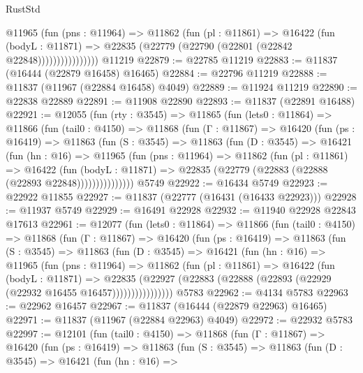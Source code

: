\begin{lexlean}{RustStd}
\begin{coremodule}
{\begin{coremodule}
{{{{{{{{{{{{{{{{{{{{{{{{{{{{{{{{{{{{{{{{{{{{{{{{{{                    @11965
                      (fun (pns : @11964) =>
                      @11862
                        (fun (pl : @11861) =>
                        @16422
                          (fun (bodyL : @11871) =>
                          @22835 (@22779 (@22790 (@22801 (@22842 @22848))))))))))))))))
    @11219
@22879 := @22785 @11219
@22883 := @11837 (@16444 (@22879 @16458) @16465)
@22884 := @22796 @11219
@22888 := @11837 (@11967 (@22884 @16458) @4049)
@22889 := @11924 @11219
@22890 := @22838 @22889
@22891 := @11908 @22890
@22893 := @11837 (@22891 @16488)
@22921 := @12055
    (fun (rty : @3545) =>
    @11865
      (fun (lets0 : @11864) =>
      @11866
        (fun (tail0 : @4150) =>
        @11868
          (fun (Γ : @11867) =>
          @16420
            (fun (ps : @16419) =>
            @11863
              (fun (S : @3545) =>
              @11863
                (fun (D : @3545) =>
                @16421
                  (fun (hn : @16) =>
                  @11965
                    (fun (pns : @11964) =>
                    @11862
                      (fun (pl : @11861) =>
                      @16422
                        (fun (bodyL : @11871) =>
                        @22835 (@22779 (@22883 (@22888 (@22893 @22848)))))))))))))))
    @5749
@22922 := @16434 @5749
@22923 := @22922 @11855
@22927 := @11837 (@22777 (@16431 (@16433 @22923)))
@22928 := @11937 @5749
@22929 := @16491 @22928
@22932 := @11940 @22928 @22843 @17613
@22961 := @12077
    (fun (lets0 : @11864) =>
    @11866
      (fun (tail0 : @4150) =>
      @11868
        (fun (Γ : @11867) =>
        @16420
          (fun (ps : @16419) =>
          @11863
            (fun (S : @3545) =>
            @11863
              (fun (D : @3545) =>
              @16421
                (fun (hn : @16) =>
                @11965
                  (fun (pns : @11964) =>
                  @11862
                    (fun (pl : @11861) =>
                    @16422
                      (fun (bodyL : @11871) =>
                      @22835
                        (@22927
                          (@22883 (@22888 (@22893 (@22929 (@22932 @16455 @16457))))))))))))))))
    @5783
@22962 := @4134 @5783
@22963 := @22962 @16457
@22967 := @11837 (@16444 (@22879 @22963) @16465)
@22971 := @11837 (@11967 (@22884 @22963) @4049)
@22972 := @22932 @5783
@22997 := @12101
    (fun (tail0 : @4150) =>
    @11868
      (fun (Γ : @11867) =>
      @16420
        (fun (ps : @16419) =>
        @11863
          (fun (S : @3545) =>
          @11863
            (fun (D : @3545) =>
            @16421
              (fun (hn : @16) =>
}}}}}}}}}}}}}}}}}}}}}}}}}}}}}}}}}}}}}}}}}}}}}}}}}}
\end{coremodule}}
\end{coremodule}
\end{lexlean}
